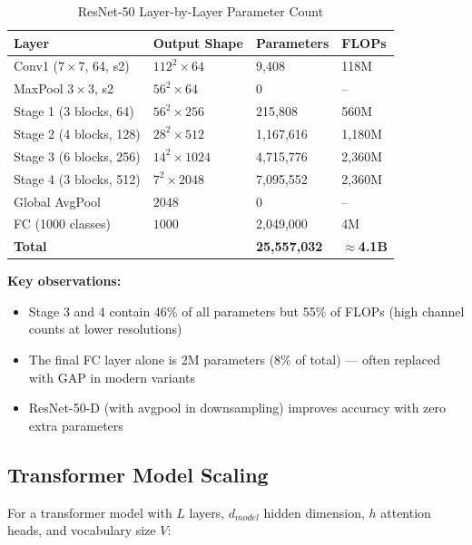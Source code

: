 \begin{table}[ht]
    \centering
    \caption{ResNet-50 Layer-by-Layer Parameter Count}
    \begin{tabular}{L{3.5cm} L{3cm} L{2.5cm} L{2.5cm}}
        \toprule
        \textbf{Layer} & \textbf{Output Shape} & \textbf{Parameters} & \textbf{FLOPs} \\
        \midrule
        Conv1 ($7\times7$, 64, s2) & $112^2 \times 64$ & 9,408 & 118M \\
        MaxPool $3\times3$, s2 & $56^2 \times 64$ & 0 & -- \\
        \midrule
        Stage 1 (3 blocks, 64) & $56^2 \times 256$ & 215,808 & 560M \\
        Stage 2 (4 blocks, 128) & $28^2 \times 512$ & 1,167,616 & 1,180M \\
        Stage 3 (6 blocks, 256) & $14^2 \times 1024$ & 4,715,776 & 2,360M \\
        Stage 4 (3 blocks, 512) & $7^2 \times 2048$ & 7,095,552 & 2,360M \\
        \midrule
        Global AvgPool & $2048$ & 0 & -- \\
        FC (1000 classes) & $1000$ & 2,049,000 & 4M \\
        \midrule
        \textbf{Total} & & \textbf{25,557,032} & \textbf{$\approx$4.1B} \\
        \bottomrule
    \end{tabular}
\end{table}

\textbf{Key observations:}
\begin{itemize}
    \item Stage 3 and 4 contain 46\% of all parameters but 55\% of FLOPs (high channel counts at lower resolutions)
    \item The final FC layer alone is 2M parameters (8\% of total) --- often replaced with GAP in modern variants
    \item ResNet-50-D (with avgpool in downsampling) improves accuracy with zero extra parameters
\end{itemize}

\subsection{Transformer Model Scaling}

For a transformer model with $L$ layers, $d_{model}$ hidden dimension, $h$ attention heads, and vocabulary size $V$:

